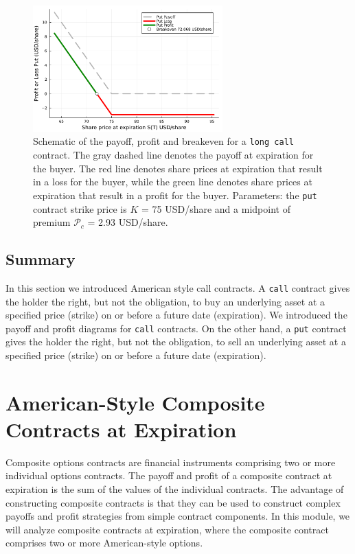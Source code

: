 \documentclass[11pt]{article}
\theoremstyle{definition}
\begin{document}
\begin{figure}[ht]
    \centering
    \includegraphics[width=0.65\textwidth]{./figs/Fig-Example-Put-K75-62DTE.pdf}
    \caption{Schematic of the payoff, profit and breakeven for a \texttt{long call} 
	contract. The gray dashed line denotes the payoff at expiration for the buyer.
	The red line denotes share prices at expiration that result in a loss for the buyer, 
	while the green line denotes share prices at expiration that result in a profit for the buyer.
	Parameters: the \texttt{put} 
	contract strike price is $K$ = 75 USD/share and a midpoint of premium $\mathcal{P}_{c}$ = 2.93 USD/share.}\label{fig:put-payoff-profit-breakeven-diagram}
\end{figure}


\subsection{Summary}
In this section we introduced American style call contracts.
A \texttt{call} contract gives the holder the right, but not the obligation, to buy an underlying asset at a specified price (strike) on or before a future date (expiration).
We introduced the payoff and profit diagrams for \texttt{call} contracts.
On the other hand, a \texttt{put} contract gives the holder the right, but not the obligation, to sell an underlying asset at a specified price (strike) on or before a future date (expiration).

\section{American-Style Composite Contracts at Expiration}
Composite options contracts are financial instruments comprising two or more individual options contracts. 
The payoff and profit of a composite contract at expiration is the sum of the values of the individual contracts. 
The advantage of constructing composite contracts is that they can be used to construct complex payoffs and profit strategies 
from simple contract components. In this module, we will analyze composite contracts at expiration, 
where the composite contract comprises two or more American-style options.
\end{document}

